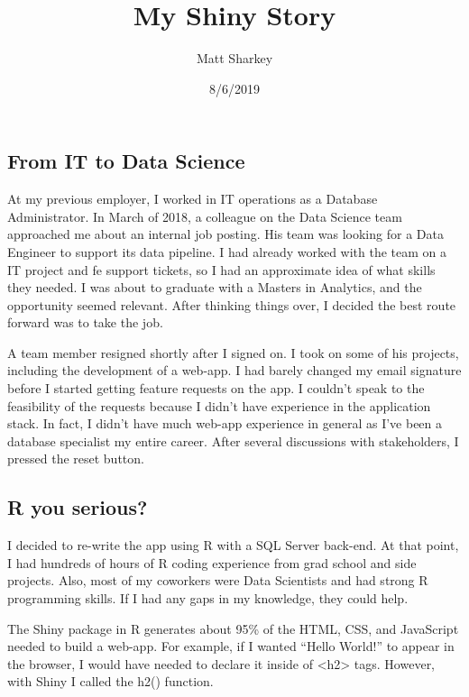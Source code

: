 \documentclass[]{article}
\title{My Shiny Story}
\author{Matt Sharkey}
\date{8/6/2019}
\begin{document}
\maketitle

\hypertarget{from-it-to-data-science}{%
\subsection{From IT to Data Science}\label{from-it-to-data-science}}

At my previous employer, I worked in IT operations as a Database
Administrator. In March of 2018, a colleague on the Data Science team
approached me about an internal job posting. His team was looking for a
Data Engineer to support its data pipeline. I had already worked with
the team on a IT project and fe support tickets, so I had an approximate
idea of what skills they needed. I was about to graduate with a Masters
in Analytics, and the opportunity seemed relevant. After thinking things
over, I decided the best route forward was to take the job.

A team member resigned shortly after I signed on. I took on some of his
projects, including the development of a web-app. I had barely changed
my email signature before I started getting feature requests on the app.
I couldn't speak to the feasibility of the requests because I didn't
have experience in the application stack. In fact, I didn't have much
web-app experience in general as I've been a database specialist my
entire career. After several discussions with stakeholders, I pressed
the reset button.

\hypertarget{r-you-serious}{%
\subsection{R you serious?}\label{r-you-serious}}

I decided to re-write the app using R with a SQL Server back-end. At
that point, I had hundreds of hours of R coding experience from grad
school and side projects. Also, most of my coworkers were Data
Scientists and had strong R programming skills. If I had any gaps in my
knowledge, they could help.

The Shiny package in R generates about 95\% of the HTML, CSS, and
JavaScript needed to build a web-app. For example, if I wanted ``Hello
World!'' to appear in the browser, I would have needed to declare it
inside of \textless{}h2\textgreater{} tags. However, with Shiny I called
the h2() function.
\end{document}
